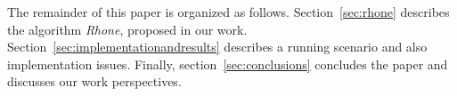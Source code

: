  The remainder of this paper is organized as follows. Section~\ref{sec:rhone}
 describes the algorithm \textit{Rhone}, proposed in our work.
 Section~\ref{sec:implementationandresults} describes a running scenario and also
 implementation issues.
 Finally, section~\ref{sec:conclusions} concludes the paper and discusses our work perspectives.


